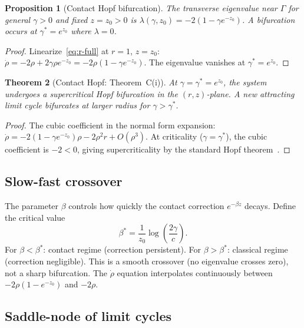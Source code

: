 \documentclass[12pt, oneside]{book}
\theoremstyle{plain}
\newtheorem{theorem}{Theorem}[section]
\newtheorem{proposition}[theorem]{Proposition}
\theoremstyle{definition}
\theoremstyle{remark}
\newcommand{\Orb}{\Gamma}
\begin{document}
\begin{proposition}[Contact Hopf bifurcation]\label{prop:hopf}
The transverse eigenvalue near $\Orb$ for general $\gamma>0$ and
fixed $z=z_0>0$ is $\lambda(\gamma,z_0)=-2(1-\gamma e^{-z_0})$.
A bifurcation occurs at $\gamma^*=e^{z_0}$ where $\lambda=0$.
\end{proposition}

\begin{proof}
Linearize~\eqref{eq:r-full} at $r=1$, $z=z_0$:
$\dot\rho=-2\rho+2\gamma\rho e^{-z_0}=-2\rho(1-\gamma e^{-z_0})$.
The eigenvalue vanishes at $\gamma^*=e^{z_0}$.
\end{proof}

\begin{theorem}[Contact Hopf: Theorem~C(i)]\label{thm:Chopf}
At $\gamma=\gamma^*=e^{z_0}$, the system undergoes a supercritical
Hopf bifurcation in the $(r,z)$-plane. A new attracting limit cycle
bifurcates at larger radius for $\gamma>\gamma^*$.
\end{theorem}
\begin{proof}
The cubic coefficient in the normal form expansion:
$\dot\rho=-2(1-\gamma e^{-z_0})\rho-2\rho^2 r+O(\rho^3)$.
At criticality ($\gamma=\gamma^*$), the cubic coefficient is $-2<0$,
giving supercriticality by the standard Hopf theorem~\cite{GH}.
\end{proof}

\subsection{Slow-fast crossover}

The parameter $\beta$ controls how quickly the contact correction
$e^{-\beta z}$ decays. Define the critical value
\[
  \beta^* = \frac{1}{z_0}\log\!\left(\frac{2\gamma}{c}\right).
\]
For $\beta<\beta^*$: contact regime (correction persistent).
For $\beta>\beta^*$: classical regime (correction negligible).
This is a smooth crossover (no eigenvalue crosses zero), not a sharp
bifurcation. The $\dot\rho$ equation interpolates continuously between
$-2\rho(1-e^{-z_0})$ and $-2\rho$.

\subsection{Saddle-node of limit cycles}
\end{document}
